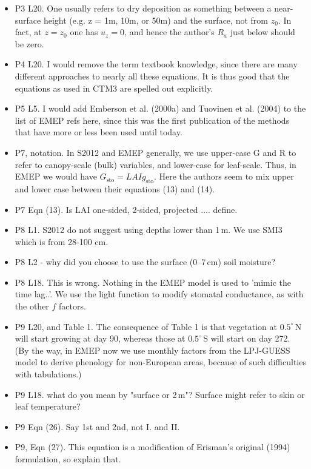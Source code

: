 \documentclass{scrartcl}
\begin{document}
\begin{itemize}
\item {\color{blue}P3 L20. One usually refers to dry deposition as something between a near-
surface height (e.g. z = 1m, 10m, or 50m) and the surface, not from $z_0$. In fact,
at $z = z_0$ one has $u_z = 0$, and hence the author’s $R_a$ just below should be zero.}
\item {\color{blue}P4 L20. I would remove the term textbook knowledge, since there are many
different approaches to nearly all these equations. It is thus good that the equations
as used in CTM3 are spelled out explicitly.}
\item {\color{blue}P5 L5. I would add Emberson et al. (2000a) and Tuovinen et al. (2004) to
the list of EMEP refs here, since this was the first publication of the methods that
have more or less been used until today.}
\item {\color{blue}P7, notation. In S2012 and EMEP generally, we use upper-case G and R to refer
to canopy-scale (bulk) variables, and lower-case for leaf-scale. Thus, in EMEP
we would have $G_\mathrm{sto} = LAI g_\mathrm{sto}$. Here the authors seem to mix upper and lower
case between their equations (13) and (14).}
\item {\color{blue}P7 Eqn (13). Is LAI one-sided, 2-sided, projected .... define.}
\item {\color{blue}P8 L1. S2012 do not suggest using depths lower than 1\,m. We use SMI3 which
is from 28-100 cm.}
\item {\color{blue}P8 L2 - why did you choose to use the surface (0--7\,cm) soil moisture?}
\item {\color{blue}P8 L18. This is wrong. Nothing in the EMEP model is used to ’mimic the
time lag..’. We use the light function to modify stomatal conductance, as with the
other $f$ factors.}
\item {\color{blue}P9 L20, and Table 1. The consequence of Table 1 is that vegetation at $0.5^\circ\,\mathrm{N}$
will start growing at day 90, whereas those at $0.5^\circ\,\mathrm{S}$ will start on day 272. (By the
way, in EMEP now we use monthly factors from the LPJ-GUESS model to derive
phenology for non-European areas, because of such difficulties with tabulations.)}
\item {\color{blue}P9 L18. what do you mean by "surface or 2\,m"? Surface might refer to skin or
leaf temperature?}
\item {\color{blue}P9 Eqn (26). Say 1st and 2nd, not I. and II.}
\item {\color{blue}P9, Eqn (27). This equation is a modification of Erisman’s original (1994) formulation, so explain that.}

\end{itemize}
\end{document}
